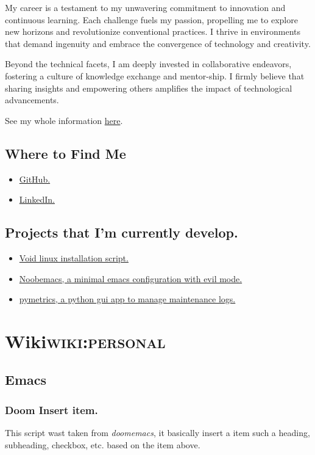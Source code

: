 \documentclass[11pt]{article}
\begin{document}
My career is a testament to my unwavering commitment to innovation and continuous learning. Each challenge fuels my passion, propelling me to explore new horizons and revolutionize conventional practices. I thrive in environments that demand ingenuity and embrace the convergence of technology and creativity.

Beyond the technical facets, I am deeply invested in collaborative endeavors, fostering a culture of knowledge exchange and mentor-ship. I firmly believe that sharing insights and empowering others amplifies the impact of technological advancements.

See my whole information \href{file:///documents/cv.pdf}{here}.
\subsection{Where to Find Me}
\label{sec:orgb30bf79}
\begin{itemize}
\item \href{https://github.com/jpachecoxyz}{GitHub.}
\item \href{https://www.linkedin.com/in/jpachecom4/}{LinkedIn.}
\end{itemize}
\subsection{Projects that I'm currently develop.}
\label{sec:org3616d22}
\begin{itemize}
\item \href{https://github.com/engjpacheco/voidstrap}{Void linux installation script.}
\item \href{https://github.com/engjpacheco/noobemacs}{Noobemacs, a minimal emacs configuration with evil mode.}
\item \href{https://github.com/engjpacheco/pymetrics}{pymetrics, a python gui app to manage maintenance logs.}
\end{itemize}
\section{Wiki\hfill{}\textsc{wiki:personal}}
\label{sec:org7c6e8cd}
\subsection{Emacs}
\label{sec:orge4c8359}
\subsubsection{Doom Insert item.}
\label{sec:org75f1d71}
This script wast taken from \emph{doomemacs}, it basically insert a item such a heading, subheading, checkbox, etc. based on the item above.
\end{document}
